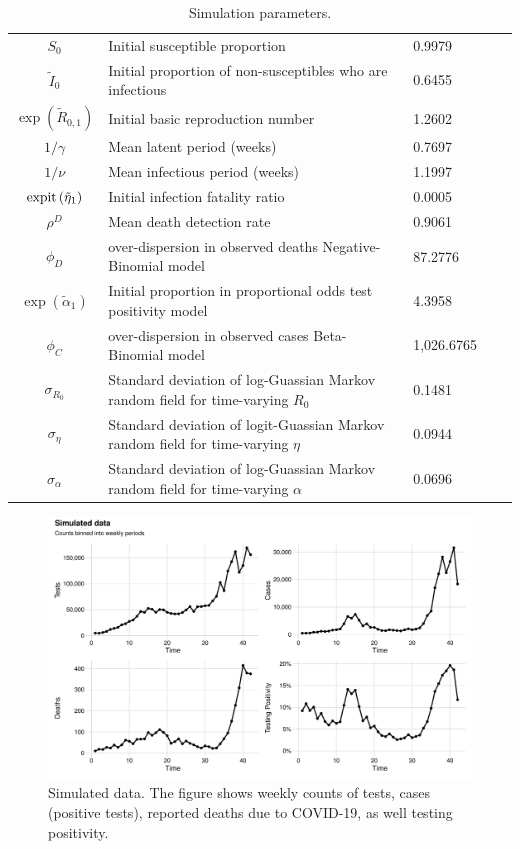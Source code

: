 \begin{table}%
	\caption[Simulation parameters.]{Simulation parameters.}
	\label{ch_4:table:simulation_parameters}
	\scriptsize\centering
	\begin{tabularx}{\columnwidth}{cXllc}
	\thead{Parameter} & \thead{Interpretation} & \thead{Value}  \\ \hline
$S_0$ & Initial susceptible proportion & 0.9979 \\
$\tilde{I}_{0}$ & Initial proportion of non-susceptibles who are infectious & 0.6455 \\
$\exp\left(\tilde{R}_{0,1}\right)$ & Initial basic reproduction number & 1.2602 \\
$1 / \gamma$ & Mean latent period (weeks) &  0.7697 \\
$1 / \nu$ & Mean infectious period (weeks) & 1.1997 \\
$\operatorname{expit}\left(\tilde{\eta}_1\right)$ & Initial infection fatality ratio & 0.0005 \\
$\rho^D$ & Mean death detection rate &  0.9061 \\
$\phi_D$ & over-dispersion in observed deaths Negative-Binomial model & 87.2776 \\
$\exp\left(\tilde{\alpha}_1\right)$ & Initial proportion in proportional odds test positivity model & 4.3958 \\
$\phi_C$ & over-dispersion in observed cases Beta-Binomial model & 1,026.6765 \\
$\sigma_{R_0}$ & Standard deviation of log-Guassian Markov random field for time-varying $R_0$ & 0.1481 \\
$\sigma_\eta$ & Standard deviation of logit-Guassian Markov random field for time-varying $\eta$ & 0.0944 \\
$\sigma_\alpha$ & Standard deviation of log-Guassian Markov random field for time-varying $\alpha$ & 0.0696 \\
\hline
	\end{tabularx}
\end{table}

\begin{figure}[h]
    \centering
    \includegraphics[width=1.0\columnwidth]{simulated_binned_data_plot}
    \caption{
    Simulated data.
    The figure shows weekly counts of tests, cases (positive tests), reported deaths due to COVID-19, as well testing positivity.}
    \label{ch_4:fig:simulated_binned_data_plot}
\end{figure}

